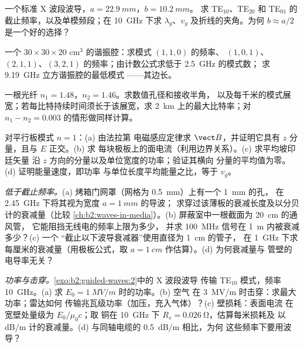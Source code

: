\begin{exercise}[$\star$]\label{exo:b2:guided-waves:2}
一个标准 X 波段波导，$a = \qty{22.9}{mm}$，$b = \qty{10.2}{mm}$。
求 TE$_{10}$、TE$_{20}$ 和 TE$_{01}$ 的截止频率，以及单模频段；在
\qty{10}{GHz} 下求 $\lambda_g$、$v_g$ 及折线的夹角。为何 $b \approx a/2$
是一个好的选择？
\end{exercise}

\begin{exercise}[$\star$]\label{exo:b2:guided-waves:3}
一个 $30 \times 30 \times 20$ cm$^3$ 的谐振腔：求模式 $(1,1,0)$ 的频率、
$(1,0,1)$、$(2,1,1)$、$(3,2,1)$ 的频率；由计数公式求低于 \qty{2.5}{GHz} 的模式数；
求 \qty{9.19}{GHz} 立方谐振腔的最低模式
——其边长。
\end{exercise}

\begin{exercise}[$\star$]\label{exo:b2:guided-waves:4}
一根光纤 $n_1 = 1.48$，$n_2 = 1.46$。求数值孔径和接收半角，
以及每千米的模式展宽；若每比特持续时间须长于该展宽，求
\qty{2}{km} 上的最大比特率；对
$n_1 - n_2 = 0.003$ 的情形做同样计算。
\end{exercise}

\begin{exercise}[$\star\star$]\label{exo:b2:guided-waves:5}
对平行板模式 $n = 1$：(a) 由法拉第
电磁感应定律求 $\vect B$，并证明它具有 $z$ 分量，且与 $E$ 正交。(b) 求
每块极板上的面电流（利用边界关系）。(c) 求平均坡印廷矢量
沿 $z$ 方向的分量以及单位宽度的功率；验证其横向
分量的平均值为零。(d) 证明能量速度，即功率
与单位长度平均能量之比，等于 $v_g$。
\end{exercise}

\begin{exercise}[$\star\star$]\label{exo:b2:guided-waves:6}
\emph{低于截止频率。}(a) 烤箱门网罩（网格为 \qty{0.5}{mm}）上有一个 \qty{1}{mm} 的孔，
在 \qty{2.45}{GHz} 下将其视为宽度 $a = \qty{1}{mm}$ 的导波；
求穿过该薄板的衰减长度及以分贝计的衰减量（比较
\cref{ch:b2:waves-in-media}）。(b) 屏蔽室中一根截面为 \qty{20}{cm} 的通风管，
它能阻挡无线电的频率上限为多少，
并求 \qty{100}{MHz} 信号在 \qty{1}{m} 内被衰减多少？(c) 一个
“截止以下波导衰减器”使用直径为 \qty{1}{cm} 的管子，
在 \qty{1}{GHz} 下求每厘米的衰减量（用极板公式，取 $a =
\qty{1}{cm}$ 作估算）。(d) 为何衰减量与
管壁的电导率无关？
\end{exercise}

\begin{exercise}[$\star\star$]\label{exo:b2:guided-waves:7}
\emph{功率与击穿。}\cref{exo:b2:guided-waves:2}中的 X 波段波导
传输 TE$_{10}$ 模式，频率 \qty{10}{GHz}。(a) 求 $E_0 = \qty{1}{MV/m}$ 时的功率。(b) 空气
在 \qty{3}{MV/m} 时击穿：求最大功率；雷达如何
传输兆瓦级功率（加压，充入气体）？(c) 壁损耗：表面电流
在宽壁处量级为 $E_0/\mu_0c$；取
铜在 \qty{10}{GHz} 下 $R_s = \qty{0.026}{\ohm}$，估算每米损耗及
以 dB/m 计的衰减量。(d) 与同轴电缆的 \qty{0.5}{dB/m} 相比，为何
这些频率下要用波导？
\end{exercise}

